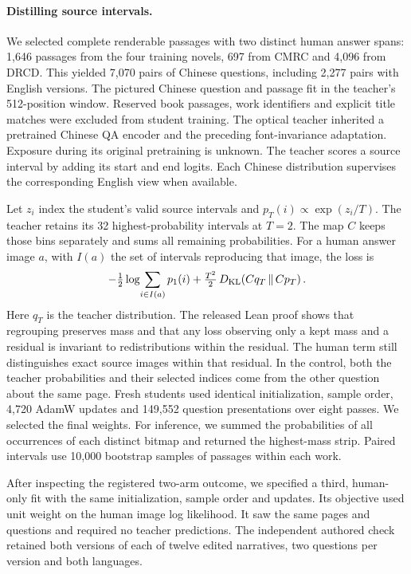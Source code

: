 \documentclass[12pt,a4paper]{article}
\providecommand{\DIFadd}[1]{{\protect\color{blue} \sf #1}} %
\begin{document}
\paragraph{\DIFadd{Distilling source intervals.}}
\DIFadd{We selected complete renderable passages with two distinct human answer spans: 1,646 passages from the four training novels, 697 from CMRC and 4,096 from DRCD. This yielded 7,070 pairs of Chinese questions, including 2,277 pairs with English versions. The pictured Chinese question and passage fit in the teacher's 512-position window. Reserved book passages, work identifiers and explicit title matches were excluded from student training. The optical teacher inherited a pretrained Chinese QA encoder and the preceding font-invariance adaptation. Exposure during its original pretraining is unknown. The teacher scores a source interval by adding its start and end logits. Each Chinese distribution supervises the corresponding English view when available.
}

\DIFadd{Let $z_i$ index the student's valid source intervals and $p_T(i)\propto\exp(z_i/T)$. The teacher retains its 32 highest-probability intervals at $T=2$. The map $C$ keeps those bins separately and sums all remaining probabilities. For a human answer image $a$, with $I(a)$ the set of intervals reproducing that image, the loss is
}\[
  -\tfrac12\log\!\sum_{i\in I(a)}p_1(i)
  +\tfrac{T^2}{2}\,D_{\rm KL}\!\left(Cq_T\,\Vert\,Cp_T\right).
\]
\DIFadd{Here $q_T$ is the teacher distribution. The released Lean proof shows that regrouping preserves mass and that any loss observing only a kept mass and a residual is invariant to redistributions within the residual. The human term still distinguishes exact source images within that residual. In the control, both the teacher probabilities and their selected indices come from the other question about the same page. Fresh students used identical initialization, sample order, 4,720 AdamW updates and 149,552 question presentations over eight passes. We selected the final weights. For inference, we summed the probabilities of all occurrences of each distinct bitmap and returned the highest-mass strip. Paired intervals use 10,000 bootstrap samples of passages within each work.
}

\DIFadd{After inspecting the registered two-arm outcome, we specified a third, human-only fit with the same initialization, sample order and updates. Its objective used unit weight on the human image log likelihood. It saw the same pages and questions and required no teacher predictions. The independent authored check retained both versions of each of twelve edited narratives, two questions per version and both languages.
}
\end{document}
